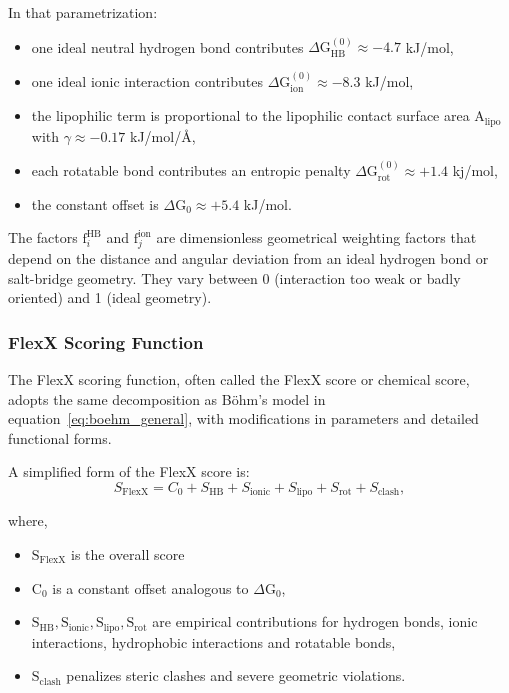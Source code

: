 \documentclass[12pt, a4paper]{article}
\begin{document}
In that parametrization:
\begin{itemize}
  \item one ideal neutral hydrogen bond contributes $\Delta \text{G}_{\text{HB}}^{(0)} \approx -4.7$ kJ/mol,
  \item one ideal ionic interaction contributes $\Delta \text{G}_{\text{ion}}^{(0)} \approx -8.3$ kJ/mol,
  \item the lipophilic term is proportional to the lipophilic contact surface area $\text{A}_{\text{lipo}}$ with
        $\gamma \approx -0.17$ kJ/mol/\r{A},
  \item each rotatable bond contributes an entropic penalty $\Delta \text{G}_{\text{rot}}^{(0)} \approx +1.4$ kj/mol,
  \item the constant offset is $\Delta \text{G}_0 \approx +5.4$ kJ/mol.
\end{itemize}

The factors $\text{f}_i^{\text{HB}}$ and $\text{f}_j^{\text{ion}}$ are dimensionless geometrical weighting factors that depend on the distance and angular deviation from an ideal hydrogen bond or salt-bridge geometry. They vary between 0 (interaction too weak or badly oriented) and 1 (ideal geometry).

\subsubsection{FlexX Scoring Function}
The FlexX scoring function, often called the FlexX score or chemical score, adopts the same decomposition as B{\"o}hm's model in equation~\eqref{eq:boehm_general}, with modifications in parameters and detailed functional forms.\cite{CH7_rarey1996,CH7_stahl,CH7_aiscore2008}

A simplified form of the FlexX score is:
\begin{equation}
  S_{\text{FlexX}}
  =
  C_0
  +
  S_{\text{HB}}
  +
  S_{\text{ionic}}
  +
  S_{\text{lipo}}
  +
  S_{\text{rot}}
  +
  S_{\text{clash}},
  \label{eq:flexx_general}
\end{equation}

where,
\begin{itemize}
  \item $\text{S}_{\text{FlexX}}$ is the overall score
  \item $\text{C}_0$ is a constant offset analogous to $\Delta \text{G}_0$,
  \item $\text{S}_{\text{HB}}, \text{S}_{\text{ionic}}, \text{S}_{\text{lipo}}, \text{S}_{\text{rot}}$ are empirical contributions for hydrogen bonds, ionic interactions, hydrophobic interactions and rotatable bonds,
  \item $\text{S}_{\text{clash}}$ penalizes steric clashes and severe geometric violations.
\end{itemize}
\end{document}
